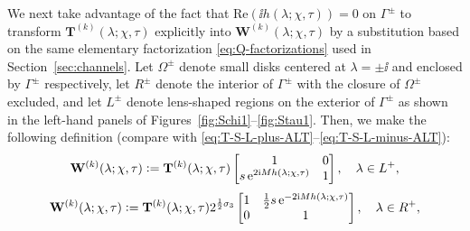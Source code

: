 We next take advantage of the fact that $\mathrm{Re}(\ii h(\lambda;\chi,\tau))=0$ on $\Gamma^\pm$ to transform $\mathbf{T}^{(k)}(\lambda;\chi,\tau)$ explicitly into $\mathbf{W}^{(k)}(\lambda;\chi,\tau)$ by a substitution based on the same elementary factorization \eqref{eq:Q-factorizations} used in Section~\ref{sec:channels}.  Let $\Omega^\pm$ denote small disks centered at $\lambda=\pm\ii$ and enclosed by $\Gamma^\pm$ respectively, let $R^\pm$ denote the interior of $\Gamma^\pm$ with the closure of $\Omega^\pm$ excluded, and let $L^\pm$ denote lens-shaped regions on the exterior of $\Gamma^\pm$ as shown in the left-hand panels of Figures~\ref{fig:Schi1}--\ref{fig:Stau1}.  Then, we make the following definition (compare with \eqref{eq:T-S-L-plus-ALT}--\eqref{eq:T-S-L-minus-ALT}):
\begin{equation}
\mathbf{W}^{(k)}(\lambda;\chi,\tau)\vcentcolon=\mathbf{T}^{(k)}(\lambda;\chi,\tau)\begin{bmatrix}
1 & 0\\ s\,\mathrm{e}^{2\mathrm{i} Mh(\lambda;\chi,\tau)} & 1\end{bmatrix},\quad\lambda\in L^+,
\label{eq:W-def-Schi-Stau-Lplus-ALT}
\end{equation}
\begin{equation}
\mathbf{W}^{(k)}(\lambda;\chi,\tau)\vcentcolon=\mathbf{T}^{(k)}(\lambda;\chi,\tau)2^{\frac{1}{2}\sigma_3}\begin{bmatrix}1 & \tfrac{1}{2}s\,\mathrm{e}^{-2\mathrm{i} M h(\lambda;\chi,\tau)}\\ 0 & 1\end{bmatrix},\quad\lambda\in R^+,
\label{eq:W-def-Schi-Stau-Rplus-ALT}
\end{equation}
